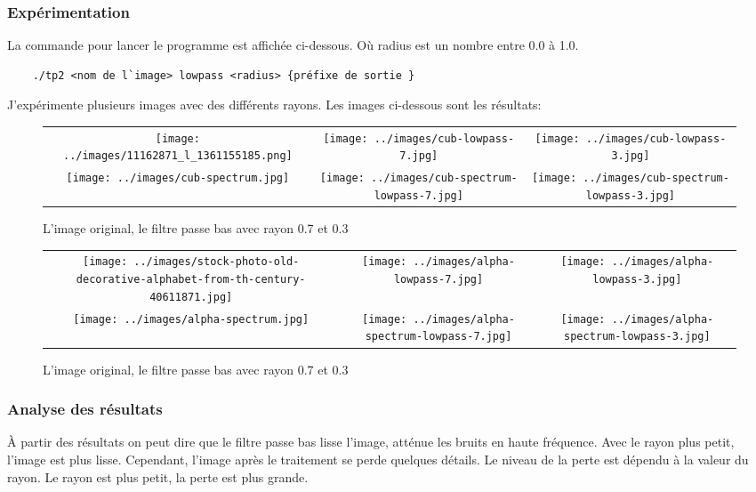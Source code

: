\documentclass[paper=a4, fontsize=11pt]{scrartcl}	%
\begin{document}
\subsubsection{Expérimentation}
La commande pour lancer le programme est affichée ci-dessous. Où radius est un nombre entre 0.0 à 1.0.
\begin{lstlisting}
	./tp2 <nom de l`image> lowpass <radius> {préfixe de sortie }
\end{lstlisting}
J'expérimente plusieurs images avec des différents rayons. Les images ci-dessous sont les résultats:
\begin{figure}[h]
	\begin{center}
		\begin{tabular}[h]{ccc}
		\texttt{[image: ../images/11162871\_l\_1361155185.png]}&
		\texttt{[image: ../images/cub-lowpass-7.jpg]}&
		\texttt{[image: ../images/cub-lowpass-3.jpg]}\\
		\texttt{[image: ../images/cub-spectrum.jpg]}&		
		\texttt{[image: ../images/cub-spectrum-lowpass-7.jpg]}&
		\texttt{[image: ../images/cub-spectrum-lowpass-3.jpg]}
		\end{tabular}

	\end{center}
	\caption{L'image original, le filtre passe bas avec rayon 0.7 et 0.3}	
\end{figure}
\newpage
\begin{figure}[h]
	\begin{center}
		\begin{tabular}[h]{ccc}
		\texttt{[image: ../images/stock-photo-old-decorative-alphabet-from-th-century-40611871.jpg]}&
		\texttt{[image: ../images/alpha-lowpass-7.jpg]}&
		\texttt{[image: ../images/alpha-lowpass-3.jpg]}\\
		\texttt{[image: ../images/alpha-spectrum.jpg]}&		
		\texttt{[image: ../images/alpha-spectrum-lowpass-7.jpg]}&
		\texttt{[image: ../images/alpha-spectrum-lowpass-3.jpg]}		\end{tabular}
	\end{center}
	\caption{L'image original, le filtre passe bas avec rayon 0.7 et 0.3}
\end{figure}

\subsubsection{Analyse des résultats}
À partir des résultats on peut dire que le filtre passe bas lisse l'image, atténue les bruits en haute fréquence. Avec le rayon plus petit, l'image est plus lisse.
Cependant, l'image après le traitement se perde quelques détails. Le niveau de la perte est dépendu à la valeur du rayon. Le rayon est plus petit, la perte est plus grande.  
\end{document}
